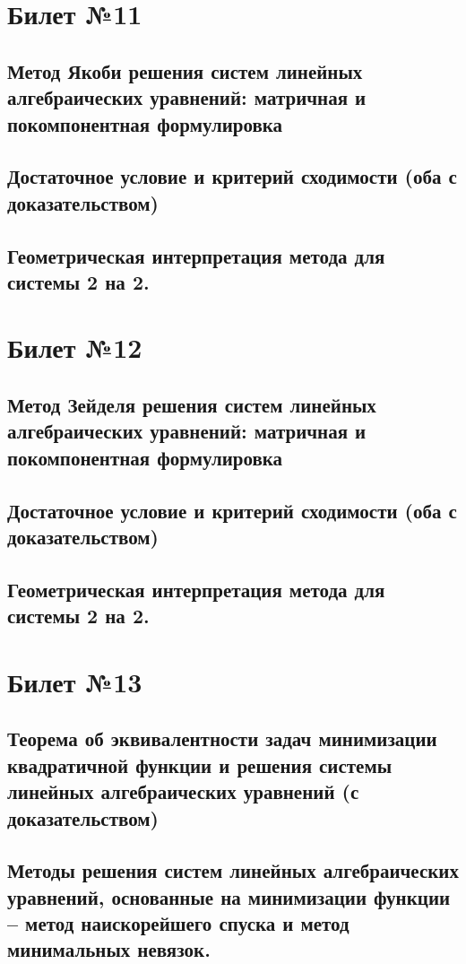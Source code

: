 \documentclass[a4paper]{article}
\begin{document}
\section{Билет №11}
\subsection{Метод Якоби решения систем линейных алгебраических уравнений: матричная и покомпонентная формулировка}
\subsection{Достаточное условие и критерий сходимости (оба с доказательством)}
\subsection{Геометрическая интерпретация метода для системы 2 на 2.}

\section{Билет №12}
\subsection{Метод Зейделя решения систем линейных алгебраических уравнений: матричная и покомпонентная формулировка}
\subsection{Достаточное условие и критерий сходимости (оба с доказательством)}
\subsection{Геометрическая интерпретация метода для системы 2 на 2.}

\section{Билет №13}
\subsection{Теорема об эквивалентности задач минимизации квадратичной функции и решения системы линейных алгебраических уравнений (с доказательством)}
\subsection{Методы решения систем линейных алгебраических уравнений, основанные на минимизации функции – метод наискорейшего спуска и метод минимальных невязок.}
\end{document}
